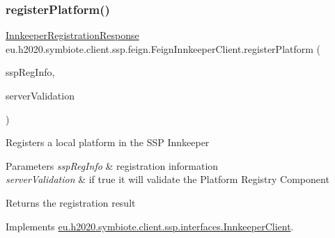 \subsubsection{\texorpdfstring{register\+Platform()}{registerPlatform()}}
{\footnotesize\ttfamily \hyperlink{classeu_1_1h2020_1_1symbiote_1_1ssp_1_1model_1_1InnkeeperRegistrationResponse}{Innkeeper\+Registration\+Response} eu.\+h2020.\+symbiote.\+client.\+ssp.\+feign.\+Feign\+Innkeeper\+Client.\+register\+Platform (\begin{DoxyParamCaption}\item[{\hyperlink{classeu_1_1h2020_1_1symbiote_1_1cloud_1_1model_1_1ssp_1_1SspRegInfo}{Ssp\+Reg\+Info}}]{ssp\+Reg\+Info,  }\item[{boolean}]{server\+Validation }\end{DoxyParamCaption})}

Registers a local platform in the S\+SP Innkeeper


\begin{DoxyParams}{Parameters}
{\em ssp\+Reg\+Info} & registration information \\
\hline
{\em server\+Validation} & if true it will validate the Platform Registry Component \\
\hline
\end{DoxyParams}
\begin{DoxyReturn}{Returns}
the registration result 
\end{DoxyReturn}


Implements \hyperlink{interfaceeu_1_1h2020_1_1symbiote_1_1client_1_1ssp_1_1interfaces_1_1InnkeeperClient_acef29ffd0a9e52784f95e3a223eca0b9}{eu.\+h2020.\+symbiote.\+client.\+ssp.\+interfaces.\+Innkeeper\+Client}.

\mbox{\label{classeu_1_1h2020_1_1symbiote_1_1client_1_1ssp_1_1feign_1_1FeignInnkeeperClient_ac6576ba5db1d2317917ec0d7237e63f1}} 
